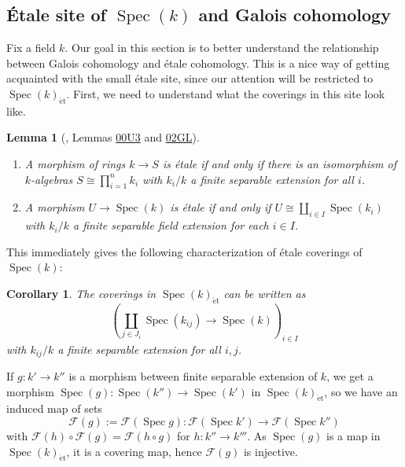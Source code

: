 \documentclass{article}
\def\~#1{\mathscr{#1}}
\numberwithin{equation}{section}
\numberwithin{figure}{section}
\newcommand{\Spec}{\mathop{\mathrm{Spec}}}
\newcommand{\et}{\acute{\mathrm{e}}\mathrm{t}}
\theoremstyle{plain}
\newtheorem{lem}[thm]{Lemma}
\newtheorem{cor}[thm]{Corollary}
\theoremstyle{definition}
\theoremstyle{remark}
\begin{document}
\subsection{\'Etale site of $\Spec(k)$ and Galois cohomology}
Fix a field $k$. Our goal in this section is to better understand the relationship between Galois cohomology and \'etale cohomology. This is a nice way of getting acquainted with the small \'etale site, since our attention will be restricted to $\Spec(k)_{\et}$. First, we need to understand what the coverings in this site look like.

\begin{lem}[\cite{stacks}, Lemmas \href{https://stacks.math.columbia.edu/tag/00U3}{00U3} and \href{https://stacks.math.columbia.edu/tag/02GL}{02GL}]\label{lem:etale_in_Speck} \hfill
\begin{enumerate}
\item A morphism of rings $k \to S$ is \'etale if and only if there is an isomorphism of $k$-algebras $S \cong \prod_{i=1}^n k_i$ with $k_i/k$ a finite separable extension for all $i$.
\item A morphism $U \to \Spec(k)$ is \'etale if and only if $U \cong \coprod_{i \in I} \Spec(k_i)$ with $k_i/k$ a finite separable field extension for each $i \in I$.
\end{enumerate}
\end{lem}

This immediately gives the following characterization of \'etale coverings of $\Spec(k)$:
\begin{cor}\label{cor:coverings_in_Speck}
    The coverings in $\Spec(k)_{\et}$ can be written as 
   \[\left(\coprod_{j \in J_i} \Spec(k_{ij}) \to \Spec(k) \right)_{i \in I}\]
   with $k_{ij}/k$ a finite separable extension for all $i,j$.  
\end{cor}
If $g: k' \to k''$  is a morphism between finite separable extension of $k$, we get a morphism $\Spec(g): \Spec(k'') \to \Spec(k')$ in $\Spec(k)_{\et}$, so we have an induced map of sets
\[\~F(g) := \~F\left(\Spec{g}\right) : \~F\left(\Spec{k'}\right) \to \~F\left(\Spec{k''}\right)\]
with $\~F\left(h\right) \circ \~F\left(g\right) = \~F\left(h \circ g\right)$ for $h: k'' \to k'''$. As $\Spec(g)$ is a map in $\Spec(k)_{\et}$, it is a covering map, hence $\~F(g)$ is injective. 
\end{document}
